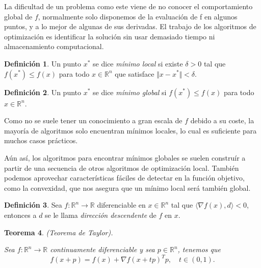 \documentclass[11pt,a4paper]{book}
\newtheorem{theorem}{Teorema}[chapter]
\theoremstyle{definition}
\newtheorem{definition}[theorem]{Definición}
\theoremstyle{remark}
\begin{document}
La dificultad de un problema como este viene de no conocer el comportamiento global de $f$, normalmente solo disponemos de la evaluación de f en algunos puntos, y a lo mejor de algunas de sus derivadas. El trabajo de los algoritmos de optimización es identificar la solución sin usar demasiado tiempo ni almacenamiento computacional.

\begin{definition}
	Un punto $x^*$ se dice \textit{mínimo local} si existe $\delta > 0$ tal que $f(x^*) \leq f(x)$ para todo $x \in \mathbb{R}^n$ que satisface $\Vert x - x^* \Vert < \delta$.
\end{definition}

\begin{definition}
	Un punto $x^*$ se dice \textit{mínimo global} si $f(x^*) \leq f(x)$ para todo $x \in \mathbb{R}^n$.
\end{definition}

Como no se suele tener un conocimiento a gran escala de $f$ debido a su coste, la mayoría de algoritmos solo encuentran mínimos locales, lo cual es suficiente para muchos casos prácticos.

Aún así, los algoritmos para encontrar mínimos globales se suelen construír a partir de una secuencia de otros algoritmos de optimización local. También podemos aprovechar características fáciles de detectar en la función objetivo, como la convexidad, que nos asegura que un mínimo local será también global.




\begin{definition}
	Sea $f: \mathbb{R}^n \rightarrow \mathbb{R}$ diferenciable en
$x \in \mathbb{R}^n$ tal que $\langle \nabla f(x), d \rangle < 0$, entonces a $d$ se le llama \textit{dirección descendente} de $f$ en $x$.
\end{definition}

\begin{theorem} %
	(Teorema de Taylor).
	
	Sea $f: \mathbb{R}^n \rightarrow \mathbb{R}$ continuamente diferenciable y sea $p \in \mathbb{R}^n$, tenemos que 
	\begin{equation}
		f(x+p) = f(x) + \nabla f(x+tp)^Tp, \quad t\in (0,1).
	\end{equation}
\end{theorem}
\end{document}
